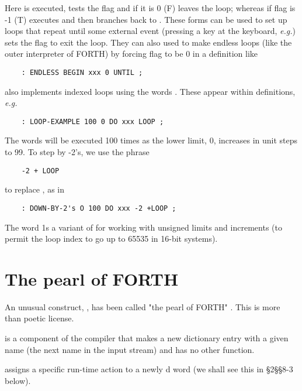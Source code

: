 Here  is executed,  tests the flag and if it is 0 (F) leaves the loop; whereas if flag is -1 (T)  executes  and  then branches back to . These forms can be used to set up loops that repeat until some external event (pressing a key at the keyboard, \textit{e.g.}) sets the flag to exit the loop. They can also used to make endless loops (like the outer interpreter of FORTH) by forcing flag to be 0 in a definition like

\begin{lstlisting}
    : ENDLESS BEGIN xxx 0 UNTIL ;
\end{lstlisting}

 also implements indexed loops using the words . These appear within definitions, \textit{e.g.}

\begin{lstlisting}
    : LOOP-EXAMPLE 100 0 DO xxx LOOP ;
\end{lstlisting}

The words  will be executed 100 times as the lower limit, 0, increases in unit steps to 99. To step by -2's, we use the phrase

\begin{lstlisting}
    -2 + LOOP
\end{lstlisting}

to replace , as in

\begin{lstlisting}
    : DOWN-BY-2's O 100 DO xxx -2 +LOOP ;
\end{lstlisting}

The word  1s a variant of  for working with unsigned limits and increments (to permit the loop index to go up to 65535 in 16-bit systems).

\section{The pearl of FORTH}

An unusual construct, , has been called "the pearl of FORTH" . This is more than poetic license.

 is a component of the compiler that makes a new dictionary entry with a given name (the next name in the input stream) and has no other function.

 assigns a specific run-time action to a newly d word (we shall see this in \S2\S\S8-3 below).


